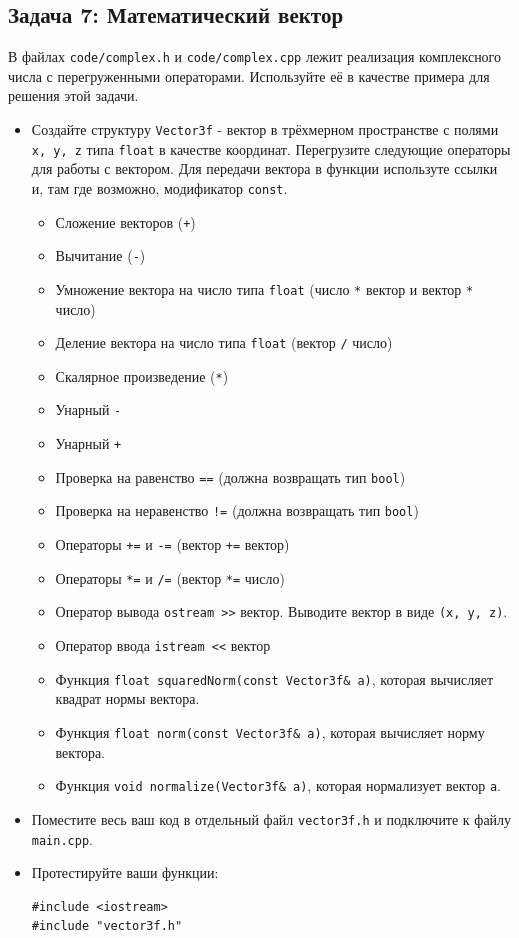 \documentclass{article}
\begin{document}
\newpage


\subsection*{Задача 7: Математический вектор}
В файлах \texttt{code/complex.h} и \texttt{code/complex.cpp} лежит реализация комплексного числа с перегруженными операторами. Используйте её в качестве примера для решения этой задачи.
\begin{itemize}
\item Создайте структуру \texttt{Vector3f} - вектор в трёхмерном пространстве с полями \texttt{x, y, z} типа \texttt{float} в качестве координат. Перегрузите следующие операторы для работы с вектором. Для передачи вектора в функции используте ссылки и, там где возможно, модификатор \texttt{const}.
	\begin{itemize}
	\item Сложение векторов (\texttt{+})
	\item Вычитание (\texttt{-})
	\item Умножение вектора на число типа \texttt{float} (число \texttt{*} вектор и вектор \texttt{*} число)
	\item Деление вектора на число типа \texttt{float} (вектор \texttt{/} число)
	\item Скалярное произведение (\texttt{*})
	\item Унарный \texttt{-}
	\item Унарный \texttt{+}
	\item Проверка на равенство \texttt{==}  (должна возвращать тип \texttt{bool})
	\item Проверка на неравенство \texttt{!=}  (должна возвращать тип \texttt{bool})
	\item Операторы \texttt{+=} и \texttt{-=}  (вектор \texttt{+=} вектор)
	\item Операторы \texttt{*=} и \texttt{/=}  (вектор \texttt{*=} число)
	\item Оператор вывода  \texttt{ostream >{}>} вектор. Выводите вектор в виде \texttt{(x, y, z)}.
	\item Оператор ввода  \texttt{istream <{}<} вектор
	\item Функция \texttt{float squaredNorm(const Vector3f\& a)}, которая вычисляет квадрат нормы вектора.
	\item Функция \texttt{float norm(const Vector3f\& a)}, которая вычисляет норму вектора.
	\item Функция \texttt{void normalize(Vector3f\& a)}, которая нормализует вектор \texttt{a}.
	\end{itemize}
\item Поместите весь ваш код в отдельный файл \texttt{vector3f.h} и подключите к файлу \texttt{main.cpp}.
\item Протестируйте ваши функции:
\begin{lstlisting}
#include <iostream>
#include "vector3f.h"


\end{lstlisting}
\end{itemize}
\end{document}
